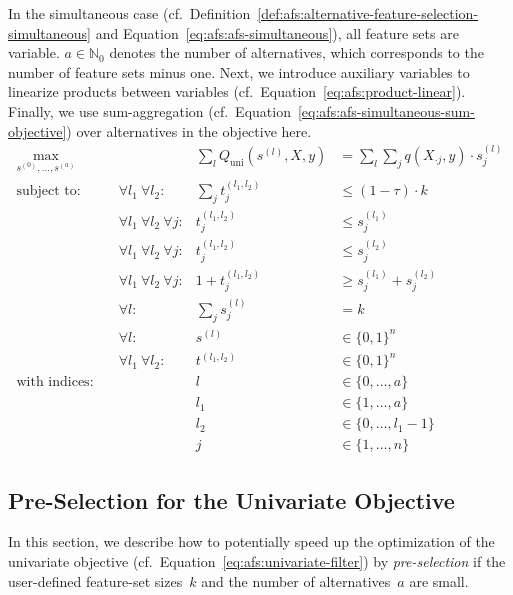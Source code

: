 \documentclass{article}
\theoremstyle{definition}
\begin{document}
In the simultaneous case (cf.~Definition~\ref{def:afs:alternative-feature-selection-simultaneous} and Equation~\ref{eq:afs:afs-simultaneous}), all feature sets are variable.
$a \in \mathbb{N}_0$ denotes the number of alternatives, which corresponds to the number of feature sets minus one.
Next, we introduce auxiliary variables to linearize products between variables (cf.~Equation~\ref{eq:afs:product-linear}).
Finally, we use sum-aggregation (cf.~Equation~\ref{eq:afs:afs-simultaneous-sum-objective}) over alternatives in the objective here.
%
\begin{equation}
	\begin{aligned}
		\max_{s^{(0)}, \dots, s^{(a)}} &\quad & \sum_l Q_{\text{uni}}(s^{(l)},X,y) &= \sum_l \sum_j q(X_{\cdot{}j},y) \cdot s^{(l)}_j\\
		\text{subject to:} &\quad \forall l_1~\forall l_2: & \sum_j t^{(l_1,l_2)}_j &\leq (1 - \tau) \cdot k \\
		&\quad \forall l_1~\forall l_2~\forall j: & t^{(l_1,l_2)}_j &\leq s^{(l_1)}_j \\
		&\quad \forall l_1~\forall l_2~\forall j: & t^{(l_1,l_2)}_j &\leq s^{(l_2)}_j \\
		&\quad \forall l_1~\forall l_2~\forall j: & 1 + t^{(l_1,l_2)}_j &\geq s^{(l_1)}_j + s^{(l_2)}_j \\
		&\quad \forall l: & \sum_j s^{(l)}_j &= k \\
		&\quad \forall l: & s^{(l)} &\in \{0,1\}^n \\
		&\quad \forall l_1~\forall l_2: & t^{(l_1,l_2)} &\in \{0,1\}^n \\
		\text{with indices:} &\quad & l &\in \{0, \dots, a\} \\
		&\quad & l_1 &\in \{1, \dots, a\} \\
		&\quad & l_2 &\in \{0, \dots, l_1-1\} \\
		&\quad & j &\in \{1, \dots, n\}
	\end{aligned}
	\label{eq:afs:afs-simultaneous-complete}
\end{equation}

\subsection{Pre-Selection for the Univariate Objective}
\label{sec:afs:appendix:univariate-pre-selection}

In this section, we describe how to potentially speed up the optimization of the univariate objective (cf.~Equation~\ref{eq:afs:univariate-filter}) by \emph{pre-selection} if the user-defined feature-set sizes~$k$ and the number of alternatives~$a$ are small.
\end{document}
